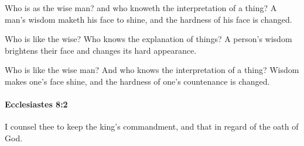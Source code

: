 			\begin{versebox}
					\item[BHS] 
					\item[LXX] 
					\item[ASV] Who is as the wise man? and who knoweth the interpretation of a thing? A man's wisdom maketh his face to shine, and the hardness of his face is changed.
					\item[NIV] Who is like the wise? Who knows the explanation of things? A person’s wisdom brightens their face and changes its hard appearance.
					\item[NRSV] Who is like the wise man? And who knows the interpretation of a thing? Wisdom makes one’s face shine, and the hardness of one’s countenance is changed.
			\end{versebox}

		\paragraph{Ecclesiastes 8:2} %
			\label{ECCLESIASTES-8-2}

			I counsel thee to keep the king’s commandment, and that in regard of the oath of God.

